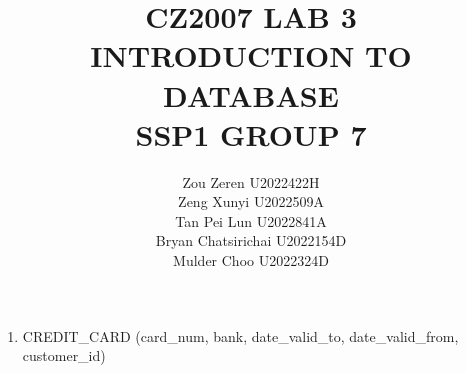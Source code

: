 \documentclass[hidelinks,12pt]{article}
\begin{document}
\title{CZ2007 LAB 3\\

\large INTRODUCTION TO DATABASE\\

SSP1 GROUP 7}

\date{}
\author{
    Zou Zeren U2022422H\\
    Zeng Xunyi U2022509A\\
    Tan Pei Lun U2022841A\\
    Bryan Chatsirichai U2022154D\\
    Mulder Choo U2022324D
}
\maketitle\thispagestyle{fancy}
\newpage

\tableofcontents
\newpage
\begin{enumerate}
    \section{CREDIT\_CARD}
    \item[] CREDIT\_CARD (card\_num, bank, date\_valid\_to, date\_valid\_from, customer\_id) 




\end{enumerate}
\end{document}
